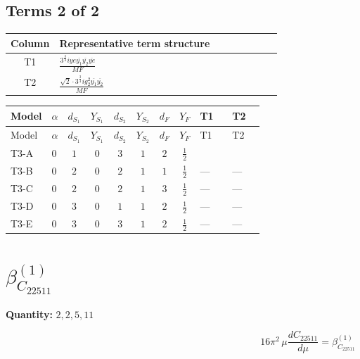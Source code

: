 \documentclass[8pt]{article}
\begin{document}
\begin{landscape}
\subsection*{Terms 2 of 2}
\begin{center}
\begin{tabular}{@{}c >{\raggedright\arraybackslash}p{0.82\linewidth}@{}}
\toprule
Column & Representative term structure \\
\midrule
T1 & \(\displaystyle \frac{3^{\frac{3}{4}} i ye \overline{y_{1}} \overline{y_{2}} \overline{ye}}{MF}\) \\
\midrule
T2 & \(\displaystyle \frac{\sqrt{2} \cdot 3^{\frac{3}{4}} i g_{2}^{2} \overline{y_{1}} \overline{y_{2}}}{MF}\) \\
\midrule
\bottomrule
\end{tabular}
\end{center}
\smallskip
\tiny
\begin{longtable}{@{}llcccccc >{\raggedright\arraybackslash}p{0.21\linewidth} >{\raggedright\arraybackslash}p{0.21\linewidth}@{}}
\toprule
Model & $\alpha$ & $d_{S_1}$ & $Y_{S_1}$ & $d_{S_2}$ & $Y_{S_2}$ & $d_F$ & $Y_F$ & T1 & T2 \\
\midrule
\endfirsthead
\toprule
Model & $\alpha$ & $d_{S_1}$ & $Y_{S_1}$ & $d_{S_2}$ & $Y_{S_2}$ & $d_F$ & $Y_F$ & T1 & T2 \\
\midrule
\endhead
T3-A & $0$ & $1$ & $0$ & $3$ & $1$ & $2$ & $\frac{1}{2}$ & \scriptsize\adjustbox{max width=\linewidth}{$\begin{gathered} - \frac{3^{\frac{3}{4}} i ye \overline{y_{1}} \overline{y_{2}} \overline{ye}}{12 MF}\end{gathered}$} & \scriptsize\adjustbox{max width=\linewidth}{$\begin{gathered} \frac{\sqrt{2} \cdot 3^{\frac{3}{4}} i g_{2}^{2} \overline{y_{1}} \overline{y_{2}}}{3 MF}\end{gathered}$} \\
\midrule
T3-B & $0$ & $2$ & $0$ & $2$ & $1$ & $1$ & $\frac{1}{2}$ & --- & --- \\
\midrule
T3-C & $0$ & $2$ & $0$ & $2$ & $1$ & $3$ & $\frac{1}{2}$ & --- & --- \\
\midrule
T3-D & $0$ & $3$ & $0$ & $1$ & $1$ & $2$ & $\frac{1}{2}$ & --- & --- \\
\midrule
T3-E & $0$ & $3$ & $0$ & $3$ & $1$ & $2$ & $\frac{1}{2}$ & --- & --- \\
\midrule
\bottomrule
\end{longtable}
\clearpage
\section*{$\beta_{C_{22511}}^{(1)}$}
\noindent\textbf{Quantity: }$\mathrm{2,2,5,11}$\par\smallskip
\[16\pi^2\,\mu\frac{d C_{22511}}{d\mu}=\beta_{C_{22511}}^{(1)}\]

\end{landscape}
\end{document}
